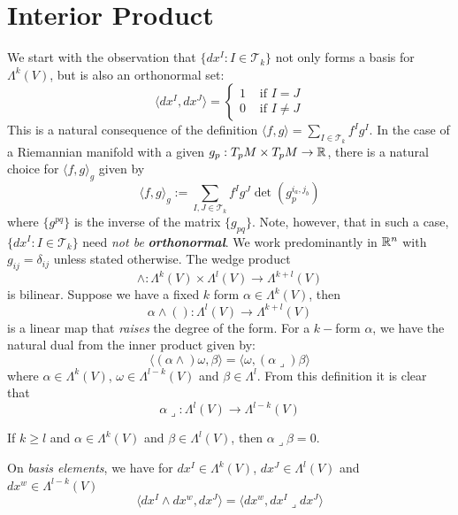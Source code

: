 \section{Interior Product}
We start with the observation that $\{dx^I: I \in \mathscr T_k\}$ not only forms a basis for $\Lambda^k(V)$, but is also an orthonormal set: $$\langle dx^I,dx^J\rangle=\begin{cases}
    1& \text{ if } I=J \\ 
    0& \text{ if } I\neq J
 \end{cases}$$
This is a natural consequence of the definition $\langle f,g\rangle=\sum_{I\in \mathscr T_k} f^Ig^I$. In the case of a Riemannian manifold with a given $g_p:T_pM\times T_pM\to \mathbb{R}$, there is a natural choice for $\langle f,g\rangle_g$ given by   \begin{equation}
    \langle f,g\rangle_g:=\sum_{I,J\in \mathscr T_k} f^I g^J \det(g^{i_a,j_b}_p)
\end{equation} 
where $\{g^{pq}\}$ is the inverse of the matrix $\{g_{pq}\}$. Note, however, that in such a case, $\{dx^I:I\in \mathscr T_k\}$ need \emph{not be} \textbf{\emph{orthonormal}}. We work predominantly in $\mathbb{R}^n$ with $g_{ij}=\delta_{ij}$ unless stated otherwise. The wedge product $$\wedge: \Lambda^k(V) \times \Lambda^l(V)\to \Lambda^{k+l}(V)$$ is bilinear. Suppose we have a fixed $k$ form $\alpha \in \Lambda^k(V)$, then $$\alpha \wedge (): \Lambda^l(V)\to \Lambda^{k+l}(V)$$ is a linear map that \emph{raises} the degree of the form.
For a $k-$form $\alpha$, we have the natural dual from the inner product given by: $$\langle (\alpha \wedge) \omega, \beta\rangle = \langle \omega, (\alpha \lrcorner) \beta \rangle $$
where $\alpha \in \Lambda^k(V)$, $\omega\in \Lambda^{l-k}(V)$ and $\beta \in \Lambda^l$. From this definition it is clear that $$\alpha \lrcorner: \Lambda^{l}(V)\to \Lambda^{l-k}(V)$$
\begin{corollary}\label{contraction_formula_basis}
    If $k\geq l$ and $\alpha \in \Lambda^k(V)$ and $\beta \in \Lambda^l(V)$, then $\alpha \lrcorner \beta=0$.

\end{corollary}
On \emph{basis elements}, we have for $dx^I \in \Lambda^k(V)$, $dx^J\in \Lambda^l(V)$ and $dx^w \in \Lambda^{l-k}(V)$ $$\langle dx^I \wedge dx^w, dx^J\rangle=\langle dx^w, dx^I \lrcorner dx^J\rangle $$ 


